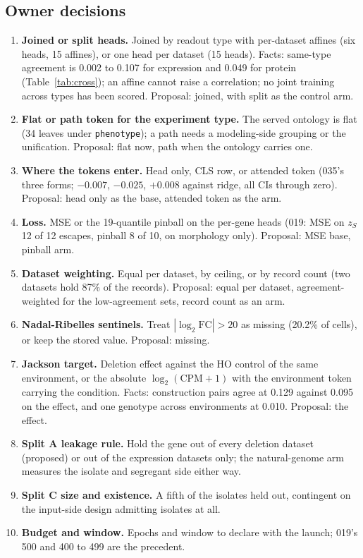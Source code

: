 \subsection{Owner decisions}
\label{sec:output-decisions}

\begin{enumerate}
\item \textbf{Joined or split heads.} Joined by readout type with per-dataset affines (six
heads, 15 affines), or one head per dataset (15 heads). Facts: same-type agreement is
0.002 to 0.107 for expression and 0.049 for protein (Table~\ref{tab:cross}); an affine
cannot raise a correlation; no joint training across types has been scored. Proposal:
joined, with split as the control arm.
\item \textbf{Flat or path token for the experiment type.} The served ontology is flat
(34 leaves under \texttt{phenotype}); a path needs a modeling-side grouping or the
unification. Proposal: flat now, path when the ontology carries one.
\item \textbf{Where the tokens enter.} Head only, CLS row, or attended token (035's three
forms; $-0.007$, $-0.025$, $+0.008$ against ridge, all CIs through zero). Proposal: head
only as the base, attended token as the arm.
\item \textbf{Loss.} MSE or the 19-quantile pinball on the per-gene heads (019: MSE on
$z_S$ 12 of 12 escapes, pinball 8 of 10, on morphology only). Proposal: MSE base, pinball
arm.
\item \textbf{Dataset weighting.} Equal per dataset, by ceiling, or by record count (two
datasets hold 87\% of the records). Proposal: equal per dataset, agreement-weighted for
the low-agreement sets, record count as an arm.
\item \textbf{Nadal-Ribelles sentinels.} Treat $|\log_2 \mathrm{FC}| > 20$ as missing
(20.2\% of cells), or keep the stored value. Proposal: missing.
\item \textbf{Jackson target.} Deletion effect against the HO control of the same
environment, or the absolute $\log_2(\mathrm{CPM}+1)$ with the environment token carrying
the condition. Facts: construction pairs agree at 0.129 against 0.095 on the effect, and
one genotype across environments at 0.010. Proposal: the effect.
\item \textbf{Split A leakage rule.} Hold the gene out of every deletion dataset (proposed)
or out of the expression datasets only; the natural-genome arm measures the isolate and
segregant side either way.
\item \textbf{Split C size and existence.} A fifth of the isolates held out, contingent on
the input-side design admitting isolates at all.
\item \textbf{Budget and window.} Epochs and window to declare with the launch; 019's 500
and 400 to 499 are the precedent.
\end{enumerate}
